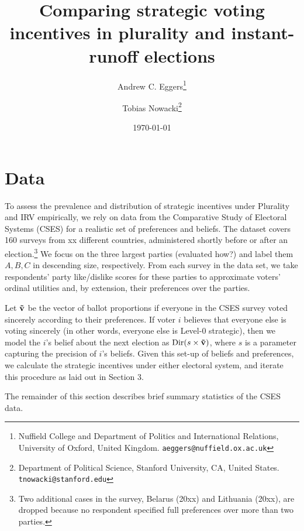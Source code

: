 \documentclass[12pt, letter]{article}
\begin{document}
\author{Andrew C. Eggers\thanks{Nuffield College and Department of Politics and International Relations, University of Oxford, United Kingdom. \texttt{aeggers@nuffield.ox.ac.uk}}
\and
Tobias Nowacki\thanks{Department of Political Science, Stanford University, CA, United States. \texttt{tnowacki@stanford.edu}}}
\date{\today}
\title{Comparing strategic voting incentives in plurality and instant-runoff elections}

\maketitle

\onehalfspacing %

\setcounter{section}{4}

\section{Data}

To assess the prevalence and distribution of strategic incentives under Plurality and IRV empirically, we rely on data from the  Comparative Study of Electoral Systems (CSES) for a realistic set of preferences and beliefs. The dataset covers 160 surveys from xx different countries, administered shortly before or after an election.\footnote{Two additional cases in the survey, Belarus (20xx) and Lithuania (20xx), are dropped because no respondent specified full preferences over more than two parties.} We focus on the three largest parties (evaluated how?) and label them $A, B, C$ in descending size, respectively. From each survey in the data set, we take respondents' party like/dislike scores for these parties to approximate voters' ordinal utilities and, by extension, their preferences over the parties.

Let $\bf \tilde{v}$ be the vector of ballot proportions if everyone in the CSES survey voted sincerely according to their preferences. If voter $i$ believes that everyone else is voting sincerely (in other words, everyone else is Level-0 strategic), then we model the $i$'s belief about the next election as $\text{Dir}(s \times \bf \tilde{v})$, where $s$ is a parameter capturing the precision of $i$'s beliefs. Given this set-up of beliefs and preferences, we calculate the strategic incentives under either electoral system, and iterate this procedure as laid out in Section 3.

The remainder of this section describes brief summary statistics of the CSES data.
\end{document}
